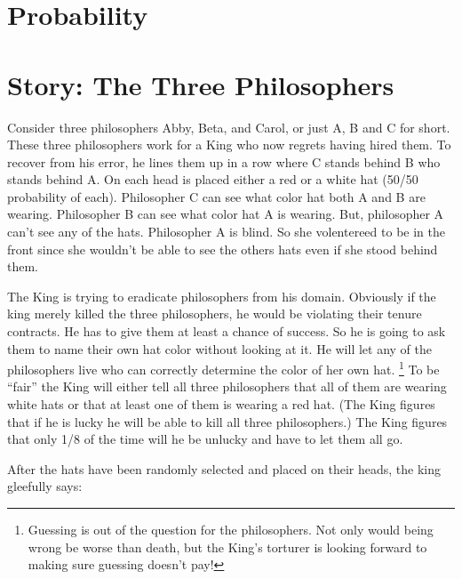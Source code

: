 \documentclass[14pt]{extarticle}
\begin{document}
 
\section{Probability} 
\label{chap:probability}
 
    \section{Story: The Three Philosophers}


Consider three philosophers Abby, Beta, and Carol, or just A, B and C
for short.  These three philosophers work for a King who now regrets
having hired them.  To recover from his error, he lines them up in a
row where C stands behind B who stands behind A.  On each head is
placed either a red or a white hat (50/50 probability of each).
Philosopher C can see what color hat both A and B are wearing.
Philosopher B can see what color hat A is wearing.  But, philosopher A
can't see any of the hats.  Philosopher A is blind.  So she
volentereed to be in the front since she wouldn't be able to see the
others hats even if she stood behind them.

The King is trying to eradicate philosophers from his domain.
Obviously if the king merely killed the three philosophers, he would
be violating their tenure contracts.  He has to give them at least a
chance of success.  So he is going to ask them to name their own hat
color without looking at it.  He will let any of the philosophers live
who can correctly determine the color of her own hat.
\footnote{Guessing is out of the question for the philosophers. Not
  only would being wrong be worse than death, but the King's torturer
  is looking forward to making sure guessing doesn't pay!} To be
``fair'' the King will either tell all three philosophers that all of
them are wearing white hats or that at least one of them is wearing a
red hat.  (The King figures that if he is lucky he will be able to
kill all three philosophers.)  The King figures that only 1/8 of the
time will he be unlucky and have to let them all go.

After the hats have been randomly selected and placed on their heads,
the king gleefully says:
\end{document}
